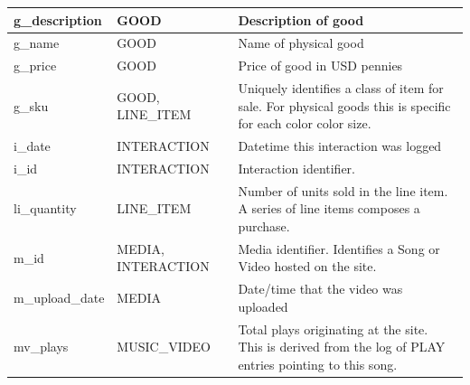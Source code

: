 \documentclass[11pt, a4paper]{report}
\begin{document}
\begin{longtable}{|l|p{4.4cm}|p{7cm}|}
g\_description          & GOOD                   & Description of good                                                                                                                                                   \\ \hline
g\_name                 & GOOD                   & Name of physical good                                                                                                                                                 \\ \hline
g\_price                & GOOD                   & Price of good in USD pennies                                                                                                                                          \\ \hline
g\_sku                  & GOOD, LINE\_ITEM        & Uniquely identifies a class of item for sale. For physical goods this is specific for each color color size.                                                          \\ \hline
i\_date                 & INTERACTION            & Datetime this interaction was logged                                                                                                                                  \\ \hline
i\_id                   & INTERACTION            & Interaction identifier.                                                                                                                                               \\ \hline
li\_quantity            & LINE\_ITEM              & Number of units sold in the line item. A series of line items composes a purchase.                                                                                    \\ \hline
m\_id                   & MEDIA, INTERACTION     & Media identifier. Identifies a Song or Video hosted on the site.                                                                                                      \\ \hline
m\_upload\_date         & MEDIA                  & Date/time that the video was uploaded                                                                                                                                 \\ \hline
mv\_plays               & MUSIC\_VIDEO            & Total plays originating at the site. This is derived from the log of PLAY entries pointing to this song.                                                              \\ \hline

\end{longtable}
\end{document}
